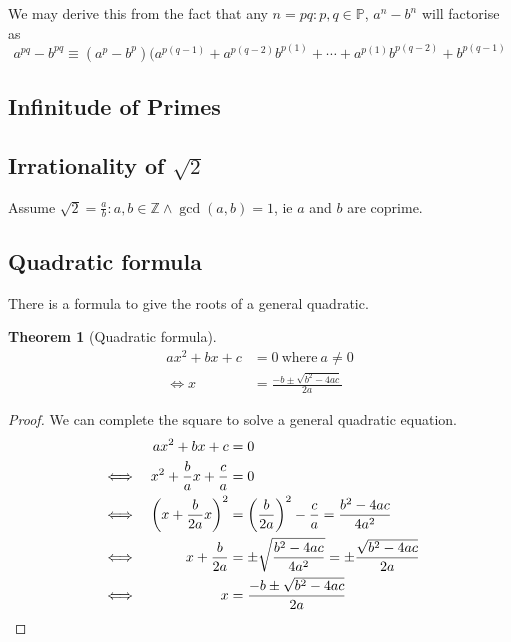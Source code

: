 \documentclass[fleqn,a4paper,11pt]{article}
\newcommand{\setstyle}{\mathbb}
\newcommand{\Integers}{\setstyle Z}
\newtheorem{theorem}{Theorem}[section]
\begin{document}
    We may derive this from the fact that any \(n = pq: p, q \in \mathbb P\),
    \(a^n - b^n\) will factorise as
    \begin{equation}
    a^{pq} - b^{pq} \equiv
     (a^p - b^p)(a^{p(q - 1)} + a^{p(q - 2)}b^{p(1)} + \dotsb +
                 a^{p(1)}b^{p(q - 2)} + b^{p(q - 1)}
    \end{equation}

    \subsection{Infinitude of Primes}

    \subsection[Irrationality of \(\sqrt 2\)]
               {Irrationality of \boldmath\(\sqrt 2\)}

    Assume \(\sqrt 2 = \frac ab : a, b \in \Integers \land \gcd(a, b) = 1\), ie
    \(a\) and \(b\) are coprime.

    \subsection{Quadratic formula} \label{sec_quad_formula}

    There is a formula to give the roots of a general quadratic.
    \begin{theorem}[Quadratic formula]
    \begin{align*}
    ax^2 + bx + c &= 0\ \text{where}\ a \neq 0 \\
    \iff x &= \frac{-b \pm \sqrt{b^2 - 4ac}}{2a}
    \end{align*}
    \end{theorem}
    \begin{proof}
    We can complete the square to solve a general quadratic equation.
    \begin{alignat*}{2}
    &&ax^2 + bx + c &= 0 \\
    &\iff& x^2 + \frac{b}{a}x + \frac{c}{a} &= 0 \\
    &\iff& \pqty{x + \frac{b}{2a}x}^2 &= \pqty{\frac{b}{2a}}^2 - \frac{c}{a}
        = \frac{b^2 - 4ac}{4a^2} \\
    &\iff& x + \frac{b}{2a} &= \pm \sqrt{\frac{b^2 - 4ac}{4a^2}}
        = \pm \frac{\sqrt{b^2 - 4ac}}{2a} \\
    &\iff& x &= \frac{-b \pm \sqrt{b^2 - 4ac}}{2a}
    \end{alignat*}
    \end{proof}
\end{document}
